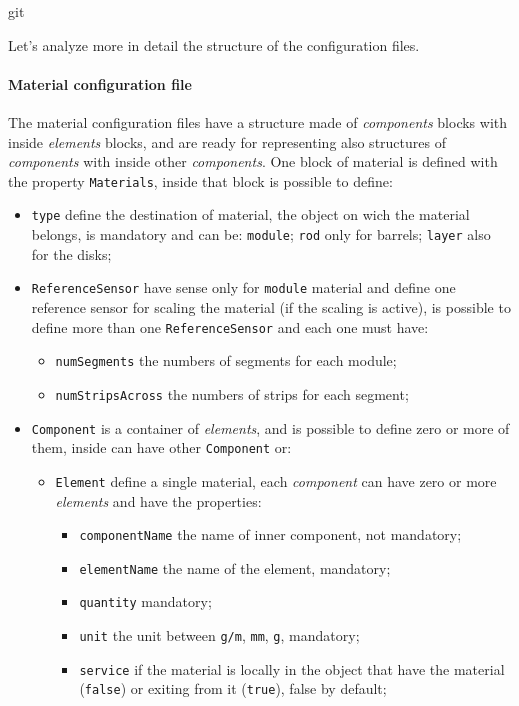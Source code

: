 git\documentclass[12pt, a4paper]{article}
\newcommand{\prop}[1]{\texttt{#1}}
\begin{document}
Let's analyze more in detail the structure of the configuration files.

\paragraph{Material configuration file}
The material configuration files have a structure made of
\emph{components} blocks with inside \emph{elements} blocks, and are ready for
representing also structures of \emph{components} with inside other
\emph{components}. One block of material is defined with the property
\prop{Materials}, inside that block is possible to define:
\begin{itemize} 
\item \prop{type} define the destination of material, the object on wich the material
  belongs, is mandatory and
  can be: \prop{module}; \prop{rod} only for barrels; \prop{layer} also for the disks;
\item \prop{ReferenceSensor} have sense only for \prop{module}
  material and define
  one reference sensor for scaling the material (if the scaling is
  active), is possible to define more than one \prop{ReferenceSensor} and each one must have:
  \begin{itemize} 
  \item \prop{numSegments} the numbers of segments for each module;
  \item \prop{numStripsAcross} the numbers of strips for each segment;
  \end{itemize}
\item \prop{Component} is a container of \emph{elements}, and is
  possible to define zero or more of them, inside can have other \prop{Component} or:
  \begin{itemize} 
  \item \prop{Element} define a single material, each \emph{component}
    can have zero or more \emph{elements} and have the properties:
    \begin{itemize} 
    \item \prop{componentName} the name of inner component, not mandatory;
    \item \prop{elementName} the name of the element, mandatory;
    \item \prop{quantity} mandatory;
    \item \prop{unit} the unit between \prop{g/m}, \prop{mm}, \prop{g}, mandatory;
    \item \prop{service} if the material is locally in the object that
      have the material (\prop{false}) or exiting from it (\prop{true}), false by default;

\end{itemize}
\end{itemize}
\end{itemize}
\end{document}
